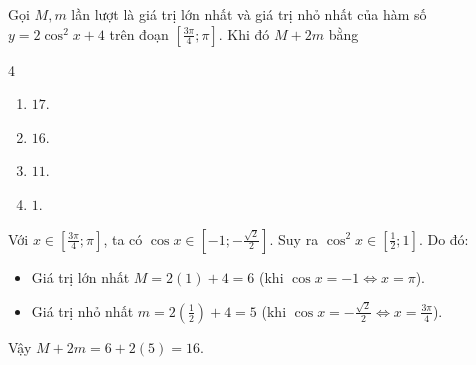 \begin{baitap}
	Gọi $M, m$ lần lượt là giá trị lớn nhất và giá trị nhỏ nhất của hàm số $y = 2\cos^2 x + 4$ trên đoạn $\left[\frac{3\pi}{4}; \pi\right]$. Khi đó $M + 2m$ bằng
	\begin{multicols}{4}
		\begin{enumerate}
			\item $17$.
			\item $16$.
			\item $11$.
			\item $1$.
		\end{enumerate}
	\end{multicols}
	\begin{traloi}
		Với $x \in \left[\frac{3\pi}{4}; \pi\right]$, ta có $\cos x \in \left[-1; -\frac{\sqrt{2}}{2}\right]$.
		Suy ra $\cos^2 x \in \left[\frac{1}{2}; 1\right]$.
		Do đó:
		\begin{itemize}
			\item Giá trị lớn nhất $M = 2(1) + 4 = 6$ (khi $\cos x = -1 \Leftrightarrow x = \pi$).
		\item Giá trị nhỏ nhất $m = 2\left(\frac{1}{2}\right) + 4 = 5$ (khi $\cos x = -\frac{\sqrt{2}}{2} \Leftrightarrow x = \frac{3\pi}{4}$).
		\end{itemize}
		Vậy $M + 2m = 6 + 2(5) = 16$.
	\end{traloi}
\end{baitap}

